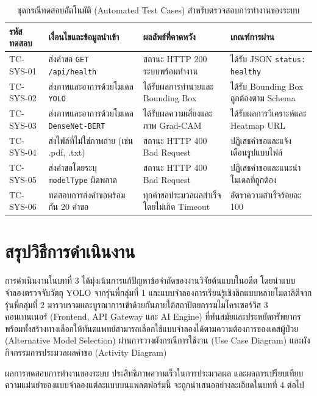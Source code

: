 \begin{table}[htbp]
\centering
\small
\caption{ชุดกรณีทดสอบอัตโนมัติ (Automated Test Cases) สำหรับตรวจสอบการทำงานของระบบ}
\label{tab:test_cases}
\begin{tabular}{p{2.2cm}p{4.2cm}p{3.5cm}p{3.5cm}}
\toprule
\textbf{รหัสทดสอบ} & \textbf{เงื่อนไขและข้อมูลนำเข้า} & \textbf{ผลลัพธ์ที่คาดหวัง} & \textbf{เกณฑ์การผ่าน} \\
\midrule
TC-SYS-01 & ส่งคำขอ \texttt{GET /api/health} & สถานะ HTTP 200 ระบบพร้อมทำงาน & ได้รับ JSON \texttt{status: healthy} \\
TC-SYS-02 & ส่งภาพและอาการด้วยโมเดล \texttt{YOLO} & ได้รับผลการทำนายและ Bounding Box & ได้รับ Bounding Box ถูกต้องตาม Schema \\
TC-SYS-03 & ส่งภาพและอาการด้วยโมเดล \texttt{DenseNet-BERT} & ได้รับผลความเสี่ยงและภาพ Grad-CAM & ได้รับผลการวิเคราะห์และ Heatmap URL \\
TC-SYS-04 & ส่งไฟล์ที่ไม่ใช่ภาพถ่าย (เช่น .pdf, .txt) & สถานะ HTTP 400 Bad Request & ปฏิเสธคำขอและแจ้งเตือนรูปแบบไฟล์ \\
TC-SYS-05 & ส่งคำขอโดยระบุ \texttt{modelType} ผิดพลาด & สถานะ HTTP 400 Bad Request & ปฏิเสธคำขอและแนะนำโมเดลที่ถูกต้อง \\
TC-SYS-06 & ทดสอบการส่งคำขอพร้อมกัน 20 คำขอ & ทุกคำขอประมวลผลสำเร็จโดยไม่เกิด Timeout & อัตราความสำเร็จร้อยละ 100 \\
\bottomrule
\end{tabular}
\end{table}

\section{สรุปวิธีการดำเนินงาน}
\label{sec:methodology_summary}

การดำเนินงานในบทที่ 3 ได้มุ่งเน้นการแก้ปัญหาข้อจำกัดของงานวิจัยต้นแบบในอดีต โดยนำแบบจำลองตรวจจับวัตถุ YOLO จากรุ่นพี่กลุ่มที่ 1 และแบบจำลองการเรียนรู้เชิงลึกแบบหลายโมดาลิตีจากรุ่นพี่กลุ่มที่ 2 มารวบรวมและบูรณาการเข้าด้วยกันภายใต้สถาปัตยกรรมไมโครเซอร์วิส 3 คอนเทนเนอร์ (Frontend, API Gateway และ AI Engine) ที่ทันสมัยและประหยัดทรัพยากร พร้อมทั้งสร้างทางเลือกให้ทันตแพทย์สามารถเลือกใช้แบบจำลองได้ตามความต้องการของเคสผู้ป่วย (Alternative Model Selection) ผ่านการวางผังกรณีการใช้งาน (Use Case Diagram) และผังกิจกรรมการประมวลผลคำขอ (Activity Diagram) 

ผลการทดสอบการทำงานของระบบ ประสิทธิภาพความเร็วในการประมวลผล และผลการเปรียบเทียบความแม่นยำของแบบจำลองแต่ละแบบบนแพลตฟอร์มนี้ จะถูกนำเสนออย่างละเอียดในบทที่ 4 ต่อไป
